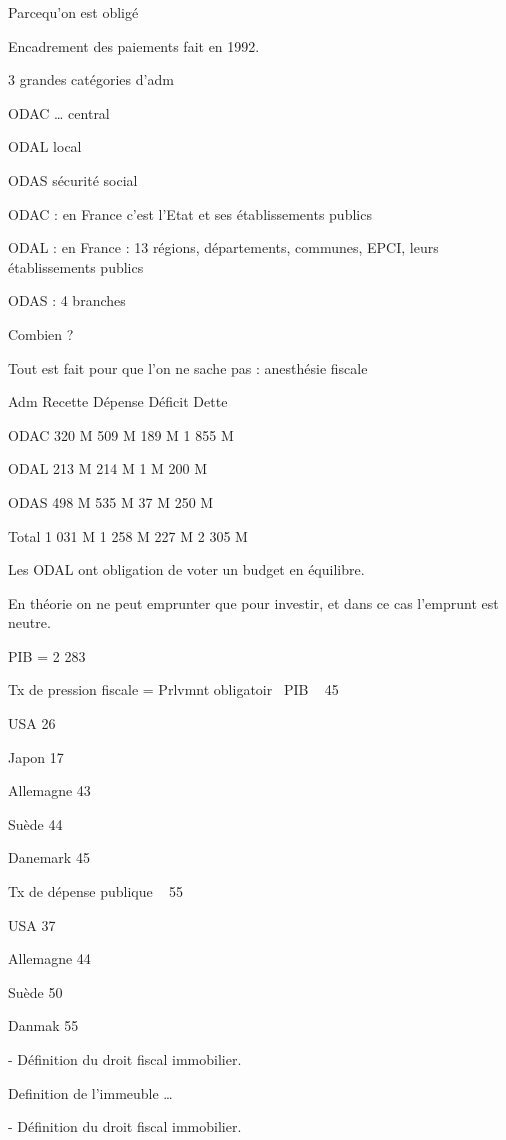 Parcequ’on est obligé

Encadrement des paiements fait en 1992.

3 grandes catégories d’adm

ODAC … central

ODAL local

ODAS sécurité social


ODAC : en France c’est l’Etat et ses établissements publics

ODAL : en France : 13 régions, départements, communes, EPCI, leurs établissements publics

ODAS : 4 branches


Combien ?

Tout est fait pour que l’on ne sache pas : anesthésie fiscale


Adm	Recette	Dépense	Déficit	Dette

ODAC	320 M	509 M	189 M	1 855 M

ODAL	213 M	214 M	1 M	200 M

ODAS	498 M	535 M	37 M	250 M

Total	1 031 M	1 258 M	227 M	2 305 M


Les ODAL ont obligation de voter un budget en équilibre.

En théorie on ne peut emprunter que pour investir, et dans ce cas l’emprunt est neutre.

PIB = 2 283

Tx de pression fiscale = Prlvmnt obligatoir \ PIB ~ 45 %


USA 26 %

Japon 17 %

Allemagne 43 %

Suède 44%

Danemark 45 %


Tx de dépense publique ~ 55 %

USA 37

Allemagne 44 %

Suède 50 %

Danmak 55%


-	Définition du droit fiscal immobilier.


Definition de l’immeuble …



-	Définition du droit fiscal immobilier.
